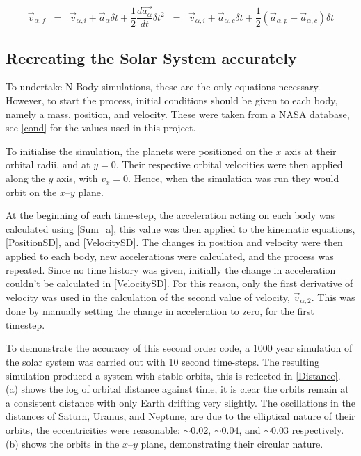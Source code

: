 \documentclass[a4paper,10pt]{article}
\begin{document}
\begin{equation} \label{VelocitySD}
     \vec{v}_{\alpha,f} \;\; =  \;\; \vec{v}_{\alpha,i} + \vec{a}_{\alpha} \delta t + \frac{1}{2}\frac{d\vec{a_\alpha}}{dt}\delta t^2 \;\; = \;\; \vec{v}_{\alpha,i} + \vec{a}_{\alpha,c} \delta t + \frac{1}{2}(\vec{a}_{\alpha,p} - \vec{a}_{\alpha,c})\delta t
\end{equation}

\subsection{Recreating the Solar System accurately}

To undertake N-Body simulations, these are the only equations necessary. However, to start the process, initial conditions should be given to each body, namely a mass, position, and velocity. These were taken from a NASA database\cite{PlanetFacts}, see \cref{cond} for the values used in this project.  

To initialise the simulation, the planets were positioned on the $x$ axis at their orbital radii, and at $y=0$. Their respective orbital velocities were then applied along the $y$ axis, with $v_x = 0$. Hence, when the simulation was run they would orbit on the $x$--$y$ plane. 

At the beginning of each time-step, the acceleration acting on each body was calculated using \cref{Sum_a}, this value was then applied to the kinematic equations, \cref{PositionSD}, and \cref{VelocitySD}. The changes in position and velocity were then applied to each body, new accelerations were calculated, and the process was repeated. Since no time history was given, initially the change in acceleration couldn't be calculated in \cref{VelocitySD}. For this reason, only the first derivative of velocity was used in the calculation of the second value of velocity, $\vec v_{\alpha,2}$. This was done by manually setting the change in acceleration to zero, for the first timestep.

To demonstrate the accuracy of this second order code, a 1000 year simulation of the solar system was carried out with 10 second time-steps. The resulting simulation produced a system with stable orbits, this is reflected in \cref{Distance}.  (a) shows the log of orbital distance against time, it is clear the orbits remain at a consistent distance with only Earth drifting very slightly. The oscillations in the distances of Saturn, Uranus, and Neptune, are due to the elliptical nature of their orbits, the eccentricities were reasonable: $\sim$0.02, $\sim$0.04, and $\sim$0.03 respectively.  (b) shows the orbits in the $x$--$y$ plane, demonstrating their circular nature. 
\end{document}
